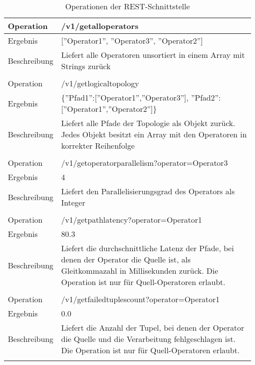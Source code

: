 \begin{longtable}{|p{2cm}|p{12cm}|}

\caption{Operationen der REST-Schnittstelle}
\endfirsthead
\caption{Operationen der REST-Schnittstelle}
\endhead
\endfoot
\endlastfoot

\hline
Operation & /v1/getalloperators \\ \hline
Ergebnis & {[}''Operator1'', ''Operator3'', ''Operator2''{]} \\ \hline
Beschreibung & Liefert alle Operatoren unsortiert in einem Array mit Strings zurück \\ \hline
\multicolumn{2}{|l|}{} \\ \hline

Operation & /v1/getlogicaltopology \\ \hline
Ergebnis & \{''Pfad1'':{[}''Operator1'',''Operator3''{]}, ''Pfad2'':{[}''Operator1'',''Operator2''{]}\} \\ \hline
Beschreibung & Liefert alle Pfade der Topologie als Objekt zurück. Jedes Objekt besitzt ein Array mit den Operatoren in korrekter Reihenfolge \\ \hline
\multicolumn{2}{|l|}{} \\ \hline

Operation & /v1/getoperatorparallelism?operator=Operator3 \\ \hline
Ergebnis & 4 \\ \hline
Beschreibung & Liefert den Parallelisierungsgrad des Operators als Integer \\ \hline
\multicolumn{2}{|l|}{} \\ \hline

Operation & /v1/getpathlatency?operator=Operator1 \\ \hline
Ergebnis & 80.3 \\ \hline
Beschreibung & Liefert die durchschnittliche Latenz der Pfade, bei denen der Operator die Quelle ist, als Gleitkommazahl in Millisekunden zurück. Die Operation ist nur für Quell-Operatoren erlaubt.  \\ \hline
\multicolumn{2}{|l|}{} \\ \hline

Operation & /v1/getfailedtuplescount?operator=Operator1 \\ \hline
Ergebnis & 0.0 \\ \hline
Beschreibung & Liefert die Anzahl der Tupel, bei denen der Operator die Quelle und die Verarbeitung fehlgeschlagen ist. Die Operation ist nur für Quell-Operatoren erlaubt.  \\ \hline
\multicolumn{2}{|l|}{} \\ \hline


\end{longtable}
